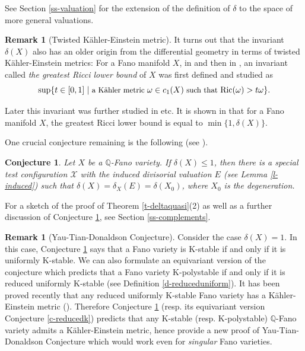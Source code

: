 \documentclass[12pt,reqno]{amsart}%
\newcommand{\cX}{{\mathcal{X}}}
\newtheorem{conj}[thm]{Conjecture}
\theoremstyle{definition}
\newtheorem{rem}[thm]{Remark}
\theoremstyle{remark}
\newcommand{\bQ}{{\mathbb{Q}}}
\begin{document}
See Section \ref{ss-valuation} for the extension of the definition of $\delta$ to the space of more general valuations. 

\begin{rem}[Twisted K\"ahler-Einstein metric]It turns out that the invariant $\delta(X)$ also has an older origin from the differential geometry in terms of twisted K\"ahler-Einstein metrics:
For a Fano manifold $X$, in \cite{Tia92} and then in \cite{Rub08, Rub09}, an invariant called {\it the greatest Ricci lower bound } of $X$ was first defined and studied  as
\[
\small{
\sup\{t \in [0, 1]\  | \mbox{ a K\"ahler metric } \omega \in c_1(X) \mbox{ such that } {\rm Ric}(\omega) > t\omega\}. 
}
\]

Later this invariant was  further studied  in \cite{Sze11, Li11, SW16} etc.
It is shown in \cite{BBJ15, CRZ18}  that for a Fano manifold $X$,  the greatest Ricci lower bound is equal to $\min\{1, \delta(X)\}$.
\end{rem}




One crucial conjecture remaining is the following (see \cite{BX19, BLZ19}).
 \begin{conj}\label{c-maxidd}
Let $X$ be a $\mathbb{Q}$-Fano variety. If $\delta(X)\le 1$, then there is a special test configuration $\cX$ with the induced divisorial valuation  $E$ (see Lemma \ref{l-induced})  such that $\delta(X)=\delta_X(E)=\delta(X_0)$, where $X_0$ is the degeneration.
\end{conj}

For a sketch of the proof of Theorem \ref{t-deltaquasi}(2) as well as a further discussion of Conjecture \ref{c-maxidd}, see Section \ref{ss-complements}. 


\begin{rem}[Yau-Tian-Donaldson Conjecture]\label{r-YTDnew}
Consider the case $\delta(X)=1$. In this case, Conjecture \ref{c-maxidd} says that a Fano variety is K-stable if and only if it is uniformly K-stable. We can also formulate an equivariant version of the conjecture which predicts that a Fano variety K-polystable if and only if it is reduced uniformly K-stable (see Definition \ref{d-reduceduniform}). It has been proved recently  that any reduced uniformly K-stable Fano variety has a K\"ahler-Einstein metric (\cite{BBJ15, LTW19, Li19}). Therefore Conjecture \ref{c-maxidd} (resp. its equivariant version Conjecture \ref{c-reducedk}) predicts that any K-stable (resp. K-polystable) $\bQ$-Fano variety admits a K\"ahler-Einstein metric, hence provide a new proof of Yau-Tian-Donaldson Conjecture which would work even for \emph{singular} Fano varieties. 
\end{rem}
\end{document}
